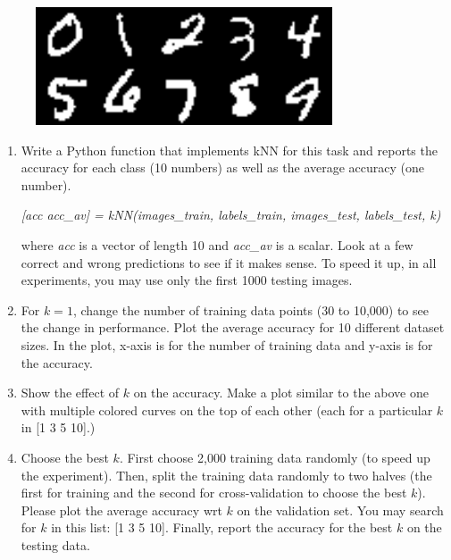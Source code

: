 \documentclass[fleqn]{article}
\begin{document}
\begin{figure}[h]
	\centering
	\includegraphics[width=.4\linewidth]{mnist-dataset.png}
\end{figure}


\begin{enumerate}


	\item Write a Python function that implements kNN for this task and reports the accuracy for each class (10 numbers) as well as the average accuracy (one number).

		      {\em [acc acc\_av] = kNN(images\_train, labels\_train, images\_test, labels\_test, k)}

	      where {\em acc} is a vector of length 10 and {\em acc\_av} is a scalar. Look at a few correct and wrong predictions to see if it makes sense. To speed it up, in all experiments, you may use only the first 1000 testing images.

	\item For $k=1$, change the number of training data points (30 to 10,000) to see the change in performance. Plot the average accuracy for 10 different dataset sizes. In the plot, x-axis is for the number of training data and y-axis is for the accuracy.

	\item Show the effect of $k$ on the accuracy. Make a plot similar to the above one with multiple colored curves on the top of each other (each for a particular $k$ in [1 3 5 10].)

	\item Choose the best $k$. First choose 2,000 training data randomly (to speed up the experiment). Then, split the training data randomly to two halves (the first for training and the second for cross-validation to choose the best $k$). Please plot the average accuracy wrt $k$ on the validation set. You may search for $k$ in this list: [1 3 5 10]. Finally, report the accuracy for the best $k$ on the testing data.

\end{enumerate}
\end{document}
